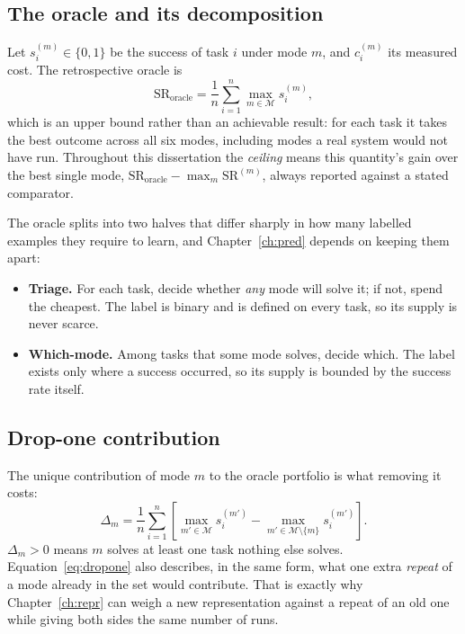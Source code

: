 \subsection{The oracle and its decomposition}

Let $s_i^{(m)} \in \{0,1\}$ be the success of task $i$ under mode $m$, and
$c_i^{(m)}$ its measured cost. The retrospective oracle is
\begin{equation}
  \mathrm{SR}_{\text{oracle}} = \frac{1}{n}\sum_{i=1}^{n} \max_{m\in\mathcal{M}} s_i^{(m)},
  \label{eq:oracle}
\end{equation}
which is an upper bound rather than an achievable result: for each task it
takes the best outcome across all six modes, including modes a real system
would not have run. Throughout this dissertation the \emph{ceiling} means this
quantity's gain over the best single mode, $\mathrm{SR}_{\text{oracle}} -
\max_m \mathrm{SR}^{(m)}$, always reported against a stated comparator.

The oracle splits into two halves that differ sharply in how many labelled
examples they require to learn, and Chapter~\ref{ch:pred} depends on keeping them apart:
\begin{itemize}[leftmargin=1.5em]
\item \textbf{Triage.} For each task, decide whether \emph{any} mode will
      solve it; if not, spend the cheapest. The label is binary and is defined
      on every task, so its supply is never scarce.
\item \textbf{Which-mode.} Among tasks that some mode solves, decide which.
      The label exists only where a success occurred, so its supply is bounded
      by the success rate itself.
\end{itemize}

\subsection{Drop-one contribution}

The unique contribution of mode $m$ to the oracle portfolio is what removing it
costs:
\begin{equation}
  \Delta_m = \frac{1}{n}\sum_{i=1}^{n}
    \left[\max_{m'\in\mathcal{M}} s_i^{(m')} - \max_{m'\in\mathcal{M}\setminus\{m\}} s_i^{(m')}\right].
  \label{eq:dropone}
\end{equation}
$\Delta_m>0$ means $m$ solves at least one task nothing else solves.
Equation~\ref{eq:dropone} also describes, in the same form, what one extra
\emph{repeat} of a mode already in the set would contribute. That is exactly why Chapter~\ref{ch:repr}
can weigh a new representation against a repeat of an old one while giving
both sides the same number of runs.

